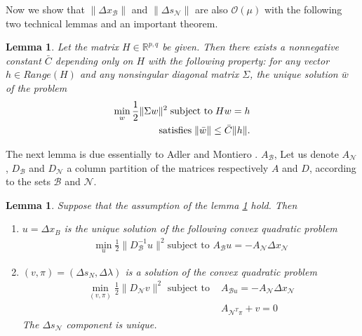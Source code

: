 \documentclass[a4paper,10 pt,titlepage,twoside]{book}
\theoremstyle{plain}
\newtheorem{lem}[thm]{Lemma}
\theoremstyle{definition}
\theoremstyle{remark}
\begin{document}
Now we show that $\lVert \Delta x_{\mathcal{B}}\rVert$ and $\lVert \Delta s_{\mathcal{N}}\rVert$ are also $\mathcal{O}(\mu)$ with the following two technical lemmas and an important theorem.
\begin{lem} \label{(T)}
	Let the matrix $H\in\mathbb{R}^{p,q}$ be given. Then there exists a nonnegative constant $\bar{C}$ depending only on $H$ with the following property: for any vector $h\in Range(H)$ and any nonsingular diagonal matrix $\Sigma$, the unique solution $\bar{w}$ of the problem
	\begin{align*}
	\min\limits_{w}\frac{1}{2}\lVert\Sigma w\rVert^{2} \text{\;subject to\;} Hw = h\\\text{satisfies\;} \lVert\bar{w}\rVert\leq \bar{C}\lVert h\rVert.
	\end{align*}
\end{lem}
The next lemma is due essentially to Adler and Montiero \cite{ADL}. $A_{\mathcal{B}}$,  Let us denote $A_{\mathcal{N}}$, $D_{\mathcal{B}}$ and $D_{\mathcal{N}}$ a column partition of the matrices respectively $A$ and $D$, according to the sets $\mathcal{B}$ and $\mathcal{N}$.
\begin{lem}
	Suppose that the assumption of the lemma \ref{(T)} hold. Then
	\begin{enumerate}
		\item $u = \Delta x_{B}$ is the unique solution of the following convex quadratic problem
		\begin{align} \label{(U)}
			\min\limits_{u}\frac{1}{2}\lVert D_{\mathcal{B}}^{-1}u\rVert^{2} \text{subject to }A_{\mathcal{B}}u = -A_{\mathcal{N}}\Delta x_{\mathcal{N}}
		\end{align}
			\item $(v, \pi) = (\Delta s_{N}, \Delta \lambda)$ is a solution of the convex quadratic problem
	\begin{align}
		\min\limits_{(v, \pi)}\frac{1}{2}\lVert D_{\mathcal{N}}v\rVert^{2} \text{ subject to } &A_{\mathcal{B}u} = -A_{\mathcal{N}}\Delta x_{\mathcal{N}}\\
		&A_{\mathcal{N}^{T}\pi}+ v =0		 
	\end{align}
		The $\Delta s_{\mathcal{N}}$ component is unique.
	\end{enumerate} 
\end{lem} 
\end{document}

